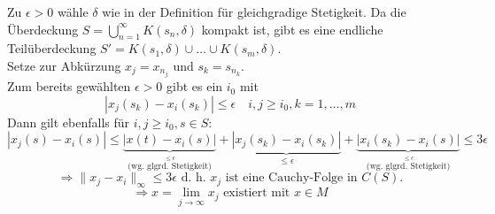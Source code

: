 \begin{beweis}
	Zu $\epsilon > 0$ wähle $\delta$ wie in der Definition für gleichgradige Stetigkeit.
	Da die Überdeckung $S = \bigcup_{n = 1}^{\infty} K(s_{n}, \delta)$ kompakt ist, gibt es eine endliche Teilüberdeckung $S' = K(s_1, \delta) \cup \dotsc \cup K(s_{m}, \delta)$. \\
	Setze zur Abkürzung $x_{j} = x_{n_{j}}$ und $s_{k} = s_{n_{k}}$. \\
	Zum bereits gewählten $\epsilon > 0$ gibt es ein $i_{0}$ mit 
	\[ | x_{j}(s_{k}) - x_{i}(s_{k}) | \leq \epsilon \quad i, j \geq i_{0}, k = 1, \dotsc, m \]
	Dann gilt ebenfalls für $i, j \geq i_{0}, s \in S$: \\
	\[ | x_{j}(s) - x_{i}(s) | \leq \underbrace{| x(t) - x_{i}(s) |}_{\overset{\leq \epsilon}{\text{(wg. glgrd. Stetigkeit)}}} + \underbrace{| x_{j}(s_{k}) - x_{i}(s_{k}) |}_{\leq \epsilon} + \underbrace{| x_{i}(s_{k}) - x_{i}(s) |}_{\overset{\leq \epsilon}{\text{(wg. glgrd. Stetigkeit)}}} \leq 3 \epsilon \]
	\[ \Rightarrow \| x_{j} - x_{i}\|_{\infty} \leq 3 \epsilon \text{ d. h. } x_{j} \text{ ist eine Cauchy-Folge in } C(S). \]
	\[ \Rightarrow x = \lim_{j \rightarrow \infty} x_{j} \text{ existiert mit } x \in M \]
\end{beweis}

\newpage






























	